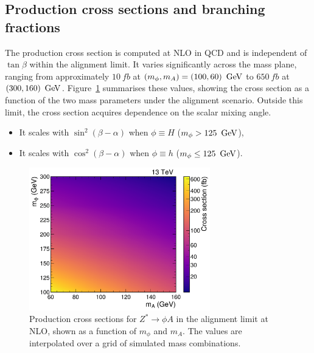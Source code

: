 \subsection{Production cross sections and branching fractions}
\label{Section:Chapter6_production_xs_bf}
The production cross section is computed at \ac{NLO} in \ac{QCD} and is independent of $\tan\beta$ within the alignment limit. It varies significantly across the mass plane, ranging from approximately $10~\unit{fb}$ at $(m_\phi, m_A) = (100, 60)~\,\text{Ge\hspace{-.08em}V}$ to $650~\unit{fb}$ at $(300, 160)~\,\text{Ge\hspace{-.08em}V}$. Figure~\ref{Figure:Chapter6_ProductionXS} summarises these values, showing the cross section as a function of the two mass parameters under the alignment scenario. Outside this limit, the cross section acquires dependence on the scalar mixing angle.

\begin{itemize}
    \item It scales with $\sin^2(\beta - \alpha)$ when $\phi \equiv H$ ($m_\phi > 125~\,\text{Ge\hspace{-.08em}V}$),
    \item It scales with $\cos^2(\beta - \alpha)$ when $\phi \equiv h$ ($m_\phi \leq 125~\,\text{Ge\hspace{-.08em}V}$).
\end{itemize}

\begin{figure}[!htbp]
  \centering
  \includegraphics[width=0.7\textwidth]{Figures/Chapter6/Production_XS.pdf}
    \caption[Production cross sections for $Z^* \to \phi A$ in the alignment limit.]{Production cross sections for $Z^* \to \phi A$ in the alignment limit at \ac{NLO}, shown as a function of $m_\phi$ and $m_A$. The values are interpolated over a grid of simulated mass combinations.}
  \label{Figure:Chapter6_ProductionXS}
\end{figure}

